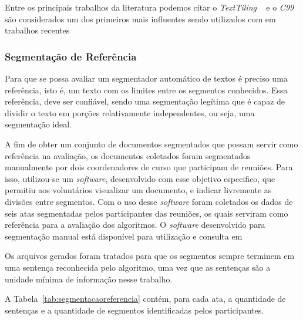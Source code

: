 
Entre os principais trabalhos da literatura podemos citar o \textit{TextTiling} ~\cite{Hearst1994} e o \textit{C99}~\cite{Choi2000} são considerados um dos primeiros mais influentes sendo utilizados com  em trabalhos recentes~\cite{CHAIBI2014, Naili2016, Cardoso2017}



\subsubsection{Segmentação de Referência}
	 \label{subsubsec:segmetacaoreferencia}

 Para que se possa avaliar um segmentador automático de textos é preciso uma referência, isto é, um texto com os limites entre os segmentos conhecidos. Essa referência, deve ser confiável, sendo uma segmentação legítima que é capaz de dividir o texto em porções relativamente independentes, ou seja, uma segmentação ideal.

A fim de obter um conjunto de documentos segmentados que possam servir como referência na avaliação, os documentos coletados foram segmentados manualmente por dois coordenadores de curso que participam de reuniões. Para isso, utilizou-se um \textit{software}, desenvolvido com esse objetivo especifico, que permitiu aos voluntários visualizar um documento, e indicar livremente as divisões entre segmentos. Com o uso desse \textit{software} foram coletados os dados de seis atas segmentadas pelos participantes das reuniões, os quais serviram como referência para a avaliação dos algoritmos. O \textit{software} desenvolvido para segmentação manual está disponível para utilização e consulta em~\urlsoftwares	

Os arquivos gerados foram tratados para que os segmentos sempre terminem em uma sentença reconhecida pelo algoritmo, uma vez que as sentenças são a unidade mínima de informação nesse trabalho.

A Tabela~\ref{tab:segmentacaoreferencia} contém, para cada ata, a quantidade de sentenças e a quantidade de segmentos identificadas pelos participantes.


